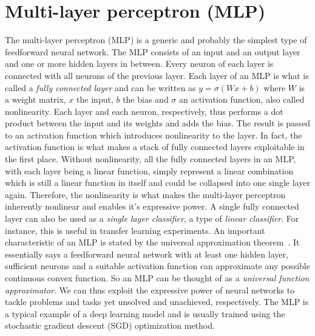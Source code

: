 \documentclass[a4paper,12pt]{report}
\begin{document}
\section{Multi-layer perceptron (MLP)}\label{subsec:mlp}
The multi-layer perceptron (MLP) is a generic and probably the simplest type of feedforward neural network. The MLP consists of an input and an output layer and one or more hidden layers in between. Every neuron of each layer is connected with all neurons of the previous layer. Each layer of an MLP is what is called a \textit{fully connected layer} and can be written as $y = \sigma (Wx + b)$ where $W$ is a weight matrix, $x$ the input, $b$ the bias and $\sigma$ an activation function, also called nonlinearity. Each layer and each neuron, respectively, thus performs a dot product between the input and its weights and adds the bias. The result is passed to an activation function which introduces nonlinearity to the layer. In fact, the activation function is what makes a stack of fully connected layers exploitable in the first place. Without nonlinearity, all the fully connected layers in an MLP, with each layer being a linear function, simply represent a linear combination which is still a linear function in itself and could be collapsed into one single layer again. Therefore, the nonlinearity is what makes the multi-layer perceptron inherently nonlinear and enables it's expressive power. A single fully connected layer can also be used as a \textit{single layer classifier}, a type of \textit{linear classifier}. For instance, this is useful in transfer learning experiments. An important characteristic of an MLP is stated by the universal approximation theorem~\cite{mlpUnivApprox}. It essentially says a feedforward neural network with at least one hidden layer, sufficient neurons and a suitable activation function can approximate any possible continuous convex function. So an MLP can be thought of as a \textit{universal function approximator}. We can thus exploit the expressive power of neural networks to tackle problems and tasks yet unsolved and unachieved, respectively. The MLP is a typical example of a deep learning model and is usually trained using the stochastic gradient descent (SGD) optimization method.

\end{document}
